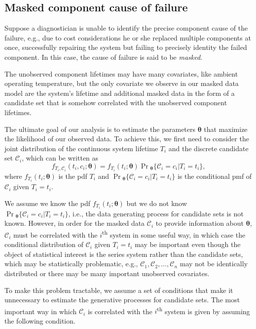 \documentclass[
]{article}
\begin{document}
\hypertarget{sec:candmod}{%
\subsection{Masked component cause of failure}\label{sec:candmod}}

Suppose a diagnostician is unable to identify the precise component
cause of the failure, e.g., due to cost considerations he or she
replaced multiple components at once, successfully repairing the system
but failing to precisely identity the failed component. In this case,
the cause of failure is said to be \emph{masked}.

The unobserved component lifetimes may have many covariates, like
ambient operating temperature, but the only covariate we observe in our
masked data model are the system's lifetime and additional masked data
in the form of a candidate set that is somehow correlated with the
unobserved component lifetimes.

The ultimate goal of our analysis is to estimate the parameters
\(\boldsymbol{\theta}\) that maximize the likelihood of our observed
data. To achieve this, we first need to consider the joint distribution
of the continuous system lifetime \(T_i\) and the discrete candidate set
\(\mathcal{C}_i\), which can be written as \[
f_{T_i,\mathcal{C}_i}(t_i,c_i;\boldsymbol{\theta}) = f_{T_i}(t_i;\boldsymbol{\theta})
    \Pr{}_{\!\boldsymbol{\theta}}\{\mathcal{C}_i = c_i | T_i = t_i\},
\] where \(f_{T_i}(t_i;\boldsymbol{\theta})\) is the pdf \(T_i\) and
\(\Pr{}_{\!\boldsymbol{\theta}}\{\mathcal{C}_i = c_i | T_i = t_i\}\) is
the conditional pmf of \(\mathcal{C}_i\) given \(T_i = t_i\).

We assume we know the pdf \(f_{T_i}(t_i;\boldsymbol{\theta})\) but we do
not know
\(\Pr{}_{\!\boldsymbol{\theta}}\{\mathcal{C}_i = c_i | T_i = t_i\}\),
i.e., the data generating process for candidate sets is not known.
However, in order for the masked data \(\mathcal{C}_i\) to provide
information about \(\boldsymbol{\theta}\), \(\mathcal{C}_i\) must be
correlated with the \(i\)\textsuperscript{th} system in some useful way,
in which case the conditional distribution of \(\mathcal{C}_i\) given
\(T_i = t_i\) may be important even though the object of statistical
interest is the series system rather than the candidate sets, which may
be statistically problematic, e.g.,
\(\mathcal{C}_1,\mathcal{C}_2,\ldots,\mathcal{C}_n\) may not be
identically distributed or there may be many important unobserved
covariates.

To make this problem tractable, we assume a set of conditions that make
it unnecessary to estimate the generative processes for candidate sets.
The most important way in which \(\mathcal{C}_i\) is correlated with the
\(i\)\textsuperscript{th} system is given by assuming the following
condition.
\end{document}
